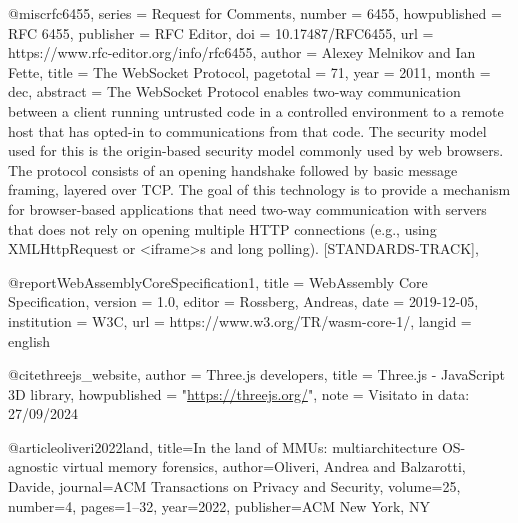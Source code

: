 @misc{rfc6455,
    series =    {Request for Comments},
    number =    6455,
    howpublished =  {RFC 6455},
    publisher = {RFC Editor},
    doi =       {10.17487/RFC6455},
    url =       {https://www.rfc-editor.org/info/rfc6455},
    author =    {Alexey Melnikov and Ian Fette},
    title =     {{The WebSocket Protocol}},
    pagetotal = 71,
    year =      2011,
    month =     dec,
    abstract =  {The WebSocket Protocol enables two-way communication between a client running untrusted code in a controlled environment to a remote host that has opted-in to communications from that code. The security model used for this is the origin-based security model commonly used by web browsers. The protocol consists of an opening handshake followed by basic message framing, layered over TCP. The goal of this technology is to provide a mechanism for browser-based applications that need two-way communication with servers that does not rely on opening multiple HTTP connections (e.g., using XMLHttpRequest or \textless{}iframe\textgreater{}s and long polling). {[}STANDARDS-TRACK{]}},
}

@report{WebAssemblyCoreSpecification1,
  title = {{WebAssembly Core Specification}},
  version = {1.0},
  editor = {Rossberg, Andreas},
  date = {2019-12-05},
  institution = {{W3C}},
  url = {https://www.w3.org/TR/wasm-core-1/},
  langid = {english}
}

@cite{threejs_website,
    author = {Three.js developers},
    title = {Three.js - JavaScript 3D library},
    howpublished = "\url{https://threejs.org/}",
    note = {Visitato in data: 27/09/2024}
}

@article{oliveri2022land,
  title={In the land of MMUs: multiarchitecture OS-agnostic virtual memory forensics},
  author={Oliveri, Andrea and Balzarotti, Davide},
  journal={ACM Transactions on Privacy and Security},
  volume={25},
  number={4},
  pages={1--32},
  year={2022},
  publisher={ACM New York, NY}
}
